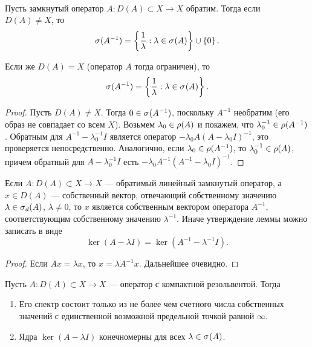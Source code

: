 \begin{theorem}\label{th:inverse_spectrum}\hfill\\
    \indent Пусть замкнутый оператор $A \colon D(A) \subset X \to X$ обратим. Тогда если
    $D(A) \neq X$, то
    \[ \spectrum{A^{-1}} 
        = \menge{\frac{1}{\lambda} : \lambda \in \spectrum{A}} \cup \menge{0}. \]

    Если же $D(A) = X$ (оператор $A$ тогда ограничен), то
    \[ \spectrum{A^{-1}} 
        = \menge{\frac{1}{\lambda} : \lambda \in \spectrum{A}}. \] 
\end{theorem}

\begin{proof}
    Пусть $D(A) \neq X$. Тогда $0 \in \spectrum{A^{-1}}$, поскольку $A^{-1}$ необратим (его образ
    не совпадает со всем $X$). Возьмем $\lambda_0 \in \resset{A}$ и покажем, 
    что $\lambda_0^{-1} \in \resset{A^{-1}}$. Обратным для
    $A^{-1} - \lambda_0^{-1} I$ является оператор $-\lambda_0 A (A - \lambda_0 I)^{-1}$,
    это проверяется непосредственно. Аналогично, если $\lambda_0 \in \resset{A^{-1}}$,
    то $\lambda_0^{-1} \in \resset{A}$, причем обратный для $A - \lambda_0^{-1} I$ есть
    $-\lambda_0 A^{-1}(A^{-1} - \lambda_0 I)^{-1}$.
\end{proof}

\begin{lemma}
    Если $A \colon D(A) \subset X \to X$ --- обратимый линейный замкнутый оператор, 
    а $x \in D(A)$ ---    собственный вектор, отвечающий собственному значению 
    $\lambda \in \spectrum[d]{A}$, $\lambda \neq 0$, то $x$ является собственным
    вектором оператора $A^{-1}$, соответствующим собственному значению $\lambda^{-1}$.
    Иначе утверждение леммы можно записать в виде
    \[ \ker (A - \lambda I) = \ker (A^{-1} - \lambda^{-1} I). \]
\end{lemma}

\begin{proof}
    Если $Ax = \lambda x$, то $x = \lambda A^{-1} x$. Дальнейшее очевидно.
\end{proof}

\begin{theorem}
    Пусть $A \colon D(A) \subset X \to X$ --- оператор с компактной резольвентой. Тогда
    \begin{enumerate}
        \item Его спектр состоит только из не более чем счетного числа собственных значений с 
        единственной возможной предельной точкой равной $\infty$.
        \item Ядра $\ker(A - \lambda I)$ конечномерны для всех $\lambda \in \spectrum{A}$.
    \end{enumerate}
\end{theorem}

